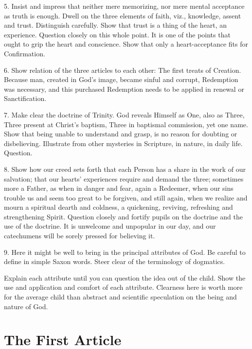 5. Insist and impress that neither mere memorizing,
nor mere mental acceptance as truth is enough. Dwell on the three elements of faith, viz.,  knowledge, assent and trust. Distinguish carefully. Show that trust is a thing of the heart, an experience. Question closely on this whole point. It is one of the points that ought to grip the heart and conscience. Show that only a heart-acceptance fits for Confirmation.

 6. Show relation of the three articles to each other: The first treats of Creation. Because man, created in God’s image, became sinful and corrupt, Redemption was necessary, and this purchased Redemption needs to be applied in renewal or Sanctification.

 7. Make clear the doctrine of Trinity. God reveals Himself as One, also as Three, Three present at Christ’s baptism, Three in baptismal commission, yet one name. Show that being unable to understand and grasp, is no reason for doubting or disbelieving. Illustrate from other mysteries in Scripture, in nature, in daily life. Question.

 8. Show how our creed sets forth that each Person has a share in the work of our salvation; that our hearts’ experiences require and demand the three; sometimes more a Father, as when in danger and fear, again a Redeemer, when our sins trouble us and seem too great to be forgiven, and still again, when we realize and mourn a spiritual dearth and
coldness, a quickening, reviving, refreshing and strengthening Spirit. Question closely and fortify pupils on the doctrine and the use of the doctrine. It is unwelcome and unpopular in our day, and our catechumens will be sorely pressed for believing it.

 9. Here it might be well to bring in the principal attributes of God. Be careful to define in simple Saxon words. Steer clear of the terminology of dogmatics.

Explain each attribute until you can question the idea out of the child. Show the use and application and comfort of each attribute. Clearness here is worth more for the average child than abstract and scientific speculation on the being and nature of God.

\section{The First Article}

